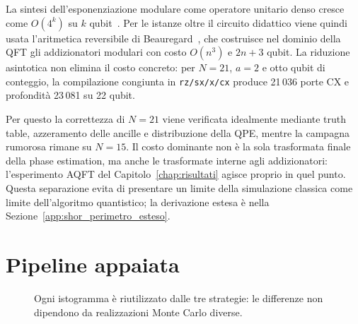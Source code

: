 \begin{onehalfspace}
La sintesi dell'esponenziazione modulare come operatore unitario denso cresce
come $O(4^k)$ su $k$ qubit~\cite{Barenco1995}. Per le istanze oltre il circuito
didattico viene quindi usata l'aritmetica reversibile di
Beauregard~\cite{beauregard2002}, che costruisce nel dominio della \ac{QFT} gli
addizionatori modulari con costo $O(n^3)$ e $2n+3$ qubit. La riduzione
asintotica non elimina il costo concreto: per $N=21$, $a=2$ e otto qubit di
conteggio, la compilazione congiunta in \texttt{rz/sx/x/cx} produce 21\,036
porte \ac{CX} e profondità 23\,081 su 22 qubit.

Per questo la correttezza di $N=21$ viene verificata idealmente mediante truth
table, azzeramento delle ancille e distribuzione della \ac{QPE}, mentre la
campagna rumorosa rimane su $N=15$. Il costo dominante non è la sola
trasformata finale della phase estimation, ma anche le trasformate interne agli
addizionatori: l'esperimento \ac{AQFT} del Capitolo~\ref{chap:risultati} agisce
proprio in quel punto. Questa separazione evita di presentare un limite della
simulazione classica come limite dell'algoritmo quantistico; la derivazione
estesa è nella Sezione~\ref{app:shor_perimetro_esteso}.

\section{Pipeline appaiata}
\label{sec:architettura}

\begin{figure}[!htbp]
\centering
{}
\caption{Ogni istogramma è riutilizzato dalle tre strategie: le differenze non
dipendono da realizzazioni Monte Carlo diverse.}
\label{fig:pipeline_architettura}
\end{figure}


\end{onehalfspace}
